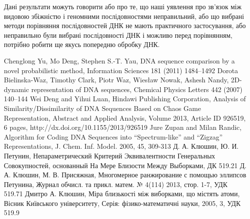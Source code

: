\documentclass[14pt,a4paper,titlepage]{extarticle}
\begin{document}
\par
Дані результати можуть говорити або про те, що наші уявлення про зв’язок між
видовою збіжністю і геномними послідовностями неправильний, або що вибрані
методи порівняння послідовностей ДНК не мають практичного застосування, або
неправильно були вибрані послідовності ДНК і можливо перед порівнянням,
потрібно робити ще якусь попередню обробку ДНК.


\newpage
\begin{thebibliography}{9}

Chenglong Yu, Mo Deng, Stephen S.-T. Yau,
DNA sequence comparison by a novel probabilistic method,
Information Sciences 181 (2011) 1484–1492
Dorota Bielinska-Waz, Timothy Clark, Piotr Waz, Wiesław Nowak, Ashesh Nandy,
2D-dynamic representation of DNA sequences,
Chemical Physics Letters 442 (2007) 140–144
Wei Deng and Yihui Luan,
Hindawi Publishing Corporation,
Analysis of Similarity/Dissimilarity of DNA Sequences Based on Chaos Game Representation,
Abstract and Applied Analysis,
Volume 2013, Article ID 926519, 6 pages,
http://dx.doi.org/10.1155/2013/926519
Jure Zupan and Milan Randic,
Algorithm for Coding DNA Sequences into “Spectrum-like” and “Zigzag” Representations,
J. Chem. Inf. Model. 2005, 45, 309-313
Д. А. Клюшин, Ю. И. Петунин,
Непараметрический Критерий Эквивалентности Генеральных Совокупностей, основанный На Мере Близости Между Выборками,
ДК 519.21
Д. А. Клюшин, М. В. Присяжная,
Многомерное ранжирование с помощью эллипсов Петунина,
Журнал обчисл. та прикл. матем. № 4(114) 2013, стор. 1-7,
УДК 519.71
Дмитро А. Клюшин,
Міра близькості між виборками, що містять атоми,
Вісник Київського університету,
Серія: фізико-математичні науки,
2005, 3,
УДК 519.9

\end{thebibliography}
\end{document}
